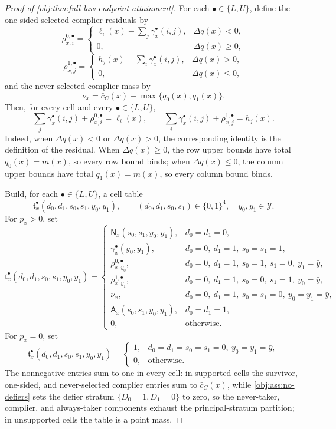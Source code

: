 \begin{proof}[Proof of \cref{obj:thm:full-law-endpoint-attainment}]
For each \(\bullet\in\{L,U\}\), define the one-sided selected-complier residuals by
\[
\rho^{0,\bullet}_{x,i}
=
\begin{cases}
\ell_i(x)-\sum_j\gamma^\bullet_x(i,j),& \Delta q(x)<0,\\
0,& \Delta q(x)\ge 0,
\end{cases}
\]
\[
\rho^{1,\bullet}_{x,j}
=
\begin{cases}
h_j(x)-\sum_i\gamma^\bullet_x(i,j),& \Delta q(x)>0,\\
0,& \Delta q(x)\le 0,
\end{cases}
\]
and the never-selected complier mass by
\[
\nu_x=\bar c_C(x)-\max\{q_0(x),q_1(x)\}.
\]
Then, for every cell and every \(\bullet\in\{L,U\}\),
\[
\sum_j\gamma^\bullet_x(i,j)+\rho^{0,\bullet}_{x,i}=\ell_i(x),
\qquad
\sum_i\gamma^\bullet_x(i,j)+\rho^{1,\bullet}_{x,j}=h_j(x).
\]
Indeed, when \(\Delta q(x)<0\) or \(\Delta q(x)>0\), the corresponding identity is the definition of the residual.  When \(\Delta q(x)\ge0\), the row upper bounds have total \(q_0(x)=m(x)\), so every row bound binds; when \(\Delta q(x)\le0\), the column upper bounds have total \(q_1(x)=m(x)\), so every column bound binds. %

Build, for each \(\bullet\in\{L,U\}\), a cell table
\[
\mathfrak t^\bullet_x(d_0,d_1,s_0,s_1,y_0,y_1),
\qquad
(d_0,d_1,s_0,s_1)\in\{0,1\}^4,\quad y_0,y_1\in\mathcal Y.
\]
For \(p_x>0\), set
\[
\mathfrak t^\bullet_x(d_0,d_1,s_0,s_1,y_0,y_1)
=
\begin{cases}
\mathsf N_x(s_0,s_1,y_0,y_1),& d_0=d_1=0,\\
\gamma^\bullet_x(y_0,y_1),& d_0=0,\ d_1=1,\ s_0=s_1=1,\\
\rho^{0,\bullet}_{x,y_0},& d_0=0,\ d_1=1,\ s_0=1,\ s_1=0,\ y_1=\bar y,\\
\rho^{1,\bullet}_{x,y_1},& d_0=0,\ d_1=1,\ s_0=0,\ s_1=1,\ y_0=\bar y,\\
\nu_x,& d_0=0,\ d_1=1,\ s_0=s_1=0,\ y_0=y_1=\bar y,\\
\mathsf A_x(s_0,s_1,y_0,y_1),& d_0=d_1=1,\\
0,& \text{otherwise.}
\end{cases}
\]
For \(p_x=0\), set
\[
\mathfrak t^\bullet_x(d_0,d_1,s_0,s_1,y_0,y_1)
=
\begin{cases}
1,& d_0=d_1=s_0=s_1=0,\ y_0=y_1=\bar y,\\
0,& \text{otherwise.}
\end{cases}
\]
The nonnegative entries sum to one in every cell: in supported cells the survivor, one-sided, and never-selected complier entries sum to \(\bar c_C(x)\), while \cref{obj:ass:no-defiers} sets the defier stratum \(\{D_0=1,D_1=0\}\) to zero, so the never-taker, complier, and always-taker components exhaust the principal-stratum partition; in unsupported cells the table is a point mass. %


\end{proof}
